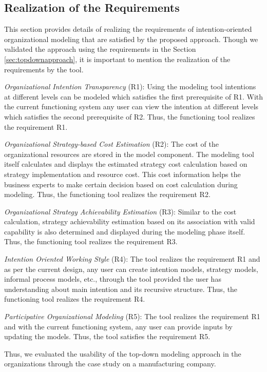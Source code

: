 \subsection{Realization of the Requirements}
\label{sec:validation}
This section provides details of realizing the requirements of intention-oriented organizational modeling that are satisfied by the proposed approach. Though we validated the approach using the requirements in the Section \ref{sec:topdownapproach}, it is important to mention the realization of the requirements by the tool.

\textit{Organizational Intention Transparency} (R1):  Using the modeling tool intentions at different levels can be modeled which satisfies the first prerequisite of R1. With the current functioning system any user can view the intention at different levels which satisfies the second prerequisite of R2. Thus, the functioning tool realizes the requirement R1.

\textit{Organizational Strategy-based Cost Estimation} (R2): The cost of the organizational resources are stored in the model component. The modeling tool itself calculates and displays the estimated strategy cost calculation based on strategy implementation and resource cost. This cost information helps the business experts to make certain decision based on cost calculation during modeling. Thus, the functioning tool realizes the requirement R2.  

\textit{Organizational Strategy Achievability Estimation} (R3): Similar to the cost calculation, strategy achievability estimation based on its association with valid capability is also determined and displayed during the modeling phase itself. Thus, the functioning tool realizes the requirement R3.

\textit{Intention Oriented Working Style} (R4): The tool realizes the requirement R1 and as per the current design, any user can create intention models, strategy models, informal process models, etc., through the tool provided the user has understanding about main intention and its recursive structure. Thus, the functioning tool realizes the requirement R4.

\textit{Participative Organizational Modeling} (R5): The tool realizes the requirement R1 and with the current functioning system, any user can provide inputs by updating the models. Thus, the tool satisfies the requirement R5.

Thus, we evaluated the usability of the top-down modeling approach in the organizations through the case study on a manufacturing company. 
		

